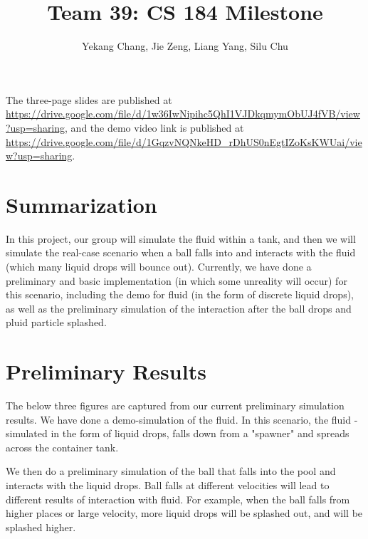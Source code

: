 \documentclass{article}
\title{Team 39: CS 184 Milestone}
\author{Yekang Chang, Jie Zeng, Liang Yang, Silu Chu}
\begin{document}
\maketitle

The three-page slides are published at \url{https://drive.google.com/file/d/1w36IwNipihc5QhI1VJDkqmymObUJ4fVB/view?usp=sharing}, and the demo video link is published at \url{https://drive.google.com/file/d/1GqzvNQNkeHD_rDhUS0nEgtIZoKsKWUai/view?usp=sharing}.

\section{Summarization}

\hspace*{1em}In this project, our group will simulate the fluid within a tank, and then we will simulate the real-case scenario when a ball falls into and interacts with the fluid (which many liquid drops will bounce out). Currently, we have done a preliminary and basic implementation (in which some unreality will occur) for this scenario, including the demo for fluid (in the form of discrete liquid drops), as well as the preliminary simulation of the interaction after the ball drops and pluid particle splashed. 

\section{Preliminary Results}

\hspace*{1em}The below three figures are captured from our current preliminary simulation results. We have done a demo-simulation of the fluid. In this scenario, the fluid - simulated in the form of liquid drops, falls down from a "spawner" and spreads across the container tank. 

\noindent\hspace*{1em} We then do a preliminary simulation of the ball that falls into the pool and interacts with the liquid drops. Ball falls at different velocities will lead to different results of interaction with fluid. For example, when the ball falls from higher places or large velocity, more liquid drops will be splashed out, and will be splashed higher. 
\end{document}
